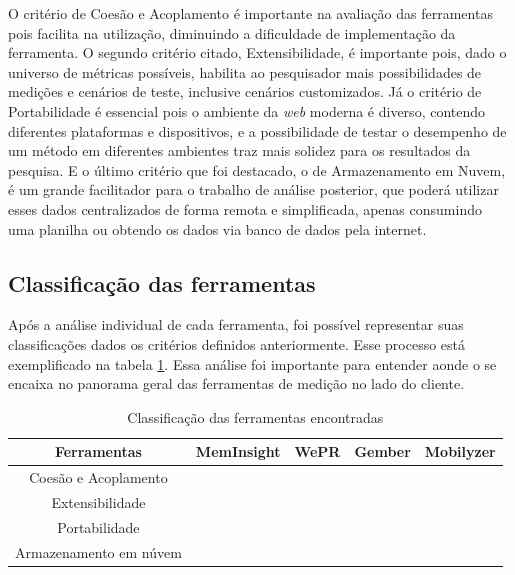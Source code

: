 \documentclass[12pt]{tcc}
\newcommand{\cmark}{\ding{51}}
\newcommand{\xmark}{\ding{55}}
\begin{document}
	\par O critério de Coesão e Acoplamento é importante na avaliação das ferramentas pois facilita na utilização, diminuindo a dificuldade de implementação da ferramenta. O segundo critério citado, Extensibilidade, é importante pois, dado o universo de métricas possíveis, habilita ao pesquisador mais possibilidades de medições e cenários de teste, inclusive cenários customizados. Já o critério de Portabilidade é essencial pois o ambiente da \emph{web} moderna é diverso, contendo diferentes plataformas e dispositivos, e a possibilidade de testar o desempenho de um método em diferentes ambientes traz mais solidez para os resultados da pesquisa. E o último critério que foi destacado, o de Armazenamento em Nuvem, é um grande facilitador para o trabalho de análise posterior, que poderá utilizar esses dados centralizados de forma remota e simplificada, apenas consumindo uma planilha ou obtendo os dados via banco de dados pela internet.

	\subsection{Classificação das ferramentas}
	\label{subsection:analise-ferramentas}
	Após a análise individual de cada ferramenta, foi possível representar suas classificações dados os critérios definidos anteriormente. Esse processo está exemplificado na tabela \ref{table:classificacao-sem-elc}. Essa análise foi importante para entender aonde o  se encaixa no panorama geral das ferramentas de medição no lado do cliente.

	\begin{table}[ht]
		\caption{Classificação das ferramentas encontradas} %
		\centering %
		\begin{tabular}{c c c c c } %
		\toprule %
		
		\textbf{Ferramentas} &\textbf{MemInsight} & \textbf{WePR} & \textbf{Gember} & \textbf{Mobilyzer}  \\ [0.4ex]
		
		\midrule %
		Coesão e Acoplamento & \cmark & \cmark & \cmark & \cmark   \\
		Extensibilidade & \xmark & \xmark & \xmark & \xmark  \\
		Portabilidade & \cmark & \xmark & \xmark & \xmark  \\
		Armazenamento em núvem & \xmark & \cmark & \cmark & \cmark  \\
		\bottomrule %
		\end{tabular}
		\label{table:classificacao-sem-elc} %
		\end{table}
\end{document}
